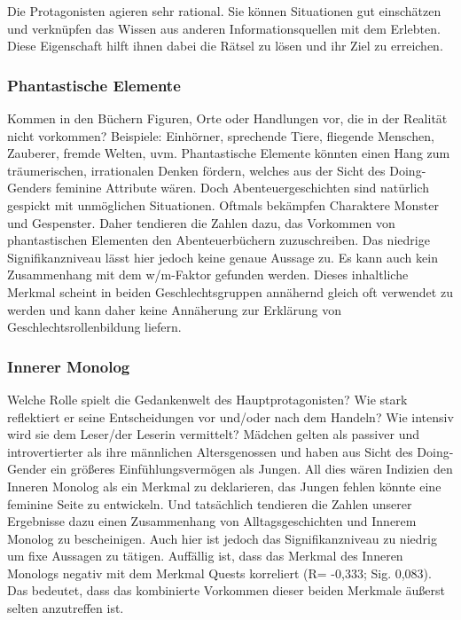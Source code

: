 Die Protagonisten agieren sehr rational. Sie können Situationen gut
einschätzen und verknüpfen das Wissen aus anderen Informationsquellen
mit dem Erlebten. Diese Eigenschaft hilft ihnen dabei die Rätsel zu
lösen und ihr Ziel zu erreichen.

\subsubsection{Phantastische Elemente}

Kommen in den Büchern Figuren, Orte oder Handlungen vor, die in der
Realität nicht vorkommen? Beispiele: Einhörner, sprechende Tiere,
fliegende Menschen, Zauberer, fremde Welten, uvm. Phantastische Elemente
könnten einen Hang zum träumerischen, irrationalen Denken fördern,
welches aus der Sicht des Doing-Genders feminine Attribute wären. Doch
Abenteuergeschichten sind natürlich gespickt mit unmöglichen
Situationen. Oftmals bekämpfen Charaktere Monster und Gespenster. Daher
tendieren die Zahlen dazu, das Vorkommen von phantastischen Elementen
den Abenteuerbüchern zuzuschreiben. Das niedrige Signifikanzniveau lässt
hier jedoch keine genaue Aussage zu. Es kann auch kein Zusammenhang mit
dem w/m-Faktor gefunden werden. Dieses inhaltliche Merkmal scheint in
beiden Geschlechtsgruppen annähernd gleich oft verwendet zu werden und
kann daher keine Annäherung zur Erklärung von Geschlechtsrollenbildung
liefern.

\subsubsection{Innerer Monolog}

Welche Rolle spielt die Gedankenwelt des Hauptprotagonisten? Wie stark
reflektiert er seine Entscheidungen vor und/oder nach dem Handeln? Wie
intensiv wird sie dem Leser/der Leserin vermittelt? Mädchen gelten als
passiver und introvertierter als ihre männlichen Altersgenossen und
haben aus Sicht des Doing-Gender ein größeres Einfühlungsvermögen als
Jungen. All dies wären Indizien den Inneren Monolog als ein Merkmal zu
deklarieren, das Jungen fehlen könnte eine feminine Seite zu entwickeln.
Und tatsächlich tendieren die Zahlen unserer Ergebnisse dazu einen
Zusammenhang von Alltagsgeschichten und Innerem Monolog zu bescheinigen.
Auch hier ist jedoch das Signifikanzniveau zu niedrig um fixe Aussagen
zu tätigen. Auffällig ist, dass das Merkmal des Inneren Monologs negativ
mit dem Merkmal Quests korreliert (R= -0,333; Sig. 0,083). Das bedeutet,
dass das kombinierte Vorkommen dieser beiden Merkmale äußerst selten
anzutreffen ist.

